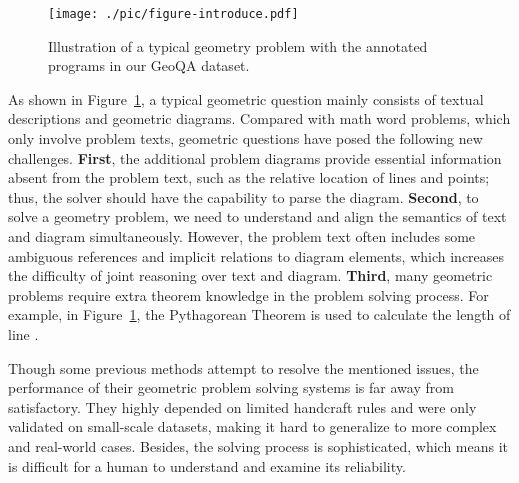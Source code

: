 \documentclass[11pt,a4paper]{article}
\begin{document}
\begin{figure}[t]
\begin{center}
 \texttt{[image: ./pic/figure-introduce.pdf]}
\end{center}
  \caption{Illustration of a typical geometry problem with the annotated programs in our GeoQA dataset. 
}
\label{fig:introduce}
\end{figure}

As shown in Figure~\ref{fig:introduce}, a typical geometric question mainly consists of textual descriptions and geometric diagrams.
Compared with math word problems, which only involve problem texts, geometric questions have posed the following new challenges. {\bf{First}}, the additional problem diagrams provide essential information absent from the problem text, such as the relative location of lines and points; thus, the solver should have the capability to parse the diagram. {\bf{Second}}, to solve a geometry problem, we need to understand and align the semantics of text and diagram simultaneously.  However, the problem text often includes some ambiguous references and implicit relations to diagram elements, which increases the difficulty of joint reasoning over text and diagram. {\bf{Third}}, many geometric problems require extra theorem knowledge in the problem solving process. For example, in Figure~\ref{fig:introduce}, the Pythagorean Theorem is used to calculate the length of line .
















Though some previous methods \cite{seo2014diagram,seo2015solving,sachan2017textbooks,sachan2020discourse,sachan2020knowledge} attempt to resolve the mentioned issues, the performance of their geometric problem solving systems is far away from satisfactory. They highly depended on limited handcraft rules and were only validated on small-scale datasets, making it hard to generalize to more complex and real-world cases. Besides, the solving process is sophisticated, which means it is difficult for a human to understand and examine its reliability.
\end{document}
